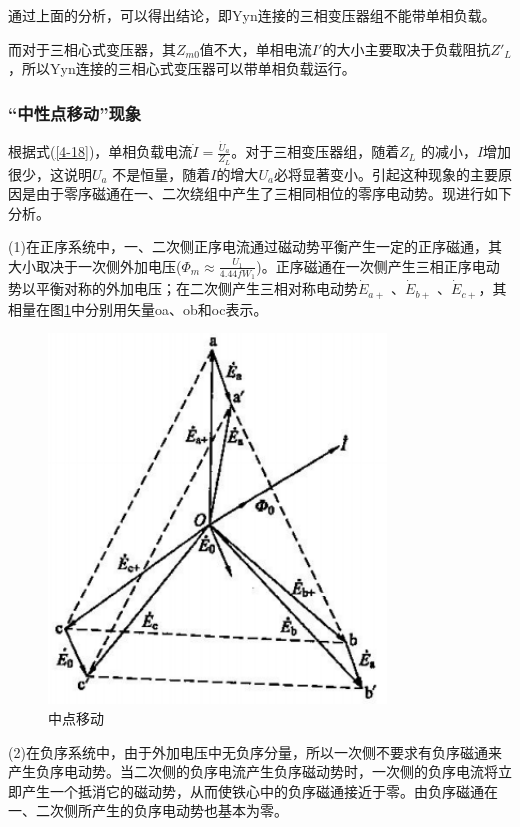 \documentclass{book}
\begin{document}
通过上面的分析，可以得出结论，即Yyn连接的三相变压器组不能带单相负载。

而对于三相心式变压器，其${{Z}_{m0}}$值不大，单相电流${I}'$的大小主要取决于负载阻抗${{{Z}'}_{L}}$，所以Yyn连接的三相心式变压器可以带单相负载运行。

\subsubsection{“中性点移动”现象}

根据式(\ref{4-18})，单相负载电流$\dot{I}=\frac{{{{\dot{U}}}_{a}}}{{{Z}_{L}}}$。对于三相变压器组，随着${{Z}_{L}}$ 的减小，$I$增加很少，这说明${{U}_{a}}$ 不是恒量，随着$I$的增大${{U}_{a}}$必将显著变小。引起这种现象的主要原因是由于零序磁通在一、二次绕组中产生了三相同相位的零序电动势。现进行如下分析。

(1)在正序系统中，一、二次侧正序电流通过磁动势平衡产生一定的正序磁通，其大小取决于一次侧外加电压(${{\Phi }_{m}}\approx \frac{{{U}_{1}}}{4.44f{{W}_{1}}}$)。正序磁通在一次侧产生三相正序电动势以平衡对称的外加电压；在二次侧产生三相对称电动势${{\dot{E}}_{a+}}$ 、${{\dot{E}}_{b+}}$ 、${{\dot{E}}_{c+}}$，其相量在图\ref{fig_4.23}中分别用矢量oa、ob和oc表示。
\begin{figure}[H]
	\centering
	\includegraphics[width=0.80\textwidth]{4-23.png}
	\caption{中点移动}
	\label{fig_4.23}
\end{figure}

(2)在负序系统中，由于外加电压中无负序分量，所以一次侧不要求有负序磁通来产生负序电动势。当二次侧的负序电流产生负序磁动势时，一次侧的负序电流将立即产生一个抵消它的磁动势，从而使铁心中的负序磁通接近于零。由负序磁通在一、二次侧所产生的负序电动势也基本为零。
\end{document}
